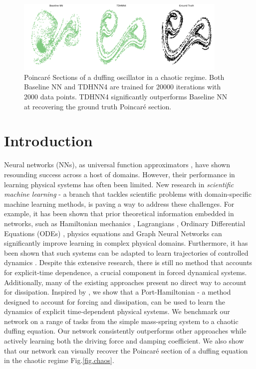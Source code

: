 \documentclass[twoside]{article}
\begin{document}
\begin{figure}[ht!]
\centering
\includegraphics[width=0.9\textwidth]{figures/main_fig.pdf}
\caption{Poincar\'e Sections of a duffing oscillator in a chaotic regime. Both Baseline NN and TDHNN4 are trained for 20000 iterations with 2000 data points. TDHNN4 significantly outperforms Baseline NN at recovering the ground truth Poincar\'e section.}
\end{figure}
\label{fig.chaos}
\section{Introduction}

Neural networks (NNs), as universal function approximators \cite{hornik_multilayer_1989}, have shown resounding success across a host of domains. However, their performance in learning physical systems has often been limited. New research in \textit{scientific machine learning} - a branch that tackles scientific problems with domain-specific machine learning methods, is paving a way to address these challenges. For example, it has been shown that prior theoretical information embedded in networks, such as Hamiltonian mechanics \cite{greydanus_hamiltonian_2019}, Lagrangians \cite{cranmer_lagrangian_2020, lutter_deep_2019}, Ordinary Differential Equations (ODEs) \cite{chen_neural_2018}, physics equations \cite{raissi_physics_2017} and Graph Neural Networks \cite{battaglia_interaction_2016,sanchez-gonzalez_hamiltonian_2019} can significantly improve learning in complex physical domains. Furthermore, it has been shown that such systems can be adapted to learn trajectories of controlled dynamics \cite{lutter_deep_2019,zhong_dissipative_2020}. Despite this extensive research, there is still no method that accounts for explicit-time dependence, a crucial component in forced dynamical systems. Additionally, many of the existing approaches present no direct way to account for dissipation. Inspired by \cite{zhong_dissipative_2020}, we show that a Port-Hamiltonian - a method designed to account for forcing and dissipation, can be used to learn the dynamics of explicit time-dependent physical systems. We benchmark our network on a range of tasks from the simple mass-spring system to a chaotic duffing equation. Our network consistently outperforms other approaches while actively learning both the driving force and damping coefficient. We also show that our network can visually recover the Poincar\'e section of a duffing equation in the chaotic regime Fig.\ref{fig.chaos}.
\end{document}
